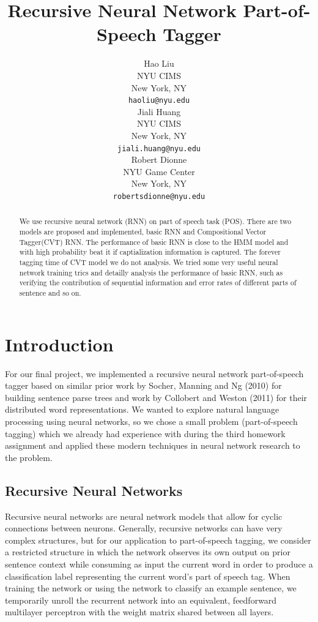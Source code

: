 \documentclass[11pt]{article}
\title{Recursive Neural Network Part-of-Speech Tagger}
\author{Hao Liu \\
  NYU CIMS \\
  New York, NY \\
  {\tt haoliu@nyu.edu} \\\And
  Jiali Huang \\
  NYU CIMS \\
  New York, NY \\
  {\tt jiali.huang@nyu.edu} \\\And
  Robert Dionne \\
  NYU Game Center \\
  New York, NY \\
  {\tt robertsdionne@nyu.edu} \\}
\date{}
\begin{document}
\maketitle
\begin{abstract}
 We use recursive neural network (RNN) on part of speech task (POS). There are two models are proposed and implemented, basic RNN and Compositional Vector Tagger(CVT) RNN. The performance of basic RNN is close to the HMM model and with high probability beat it if captialization information is captured. The forever tagging time of CVT model we do not analysis. We tried some very useful neural network training trics and detailly analysis the performance of basic RNN, such as verifying the contribution of sequential information and error rates of different parts of sentence and so on.
\end{abstract}

\section{Introduction}

For our final project, we implemented a recursive neural network part-of-speech tagger based on similar prior work by Socher, Manning and Ng (2010) for building sentence parse trees and work by Collobert and Weston (2011) for their distributed word representations. We wanted to explore natural language processing using neural networks, so we chose a small problem (part-of-speech tagging) which we already had experience with during the third homework assignment and applied these modern techniques in neural network research to the problem.

\subsection{Recursive Neural Networks}

Recursive neural networks are neural network models that allow for cyclic connections between neurons. Generally, recursive networks can have very complex structures, but for our application to part-of-speech tagging, we consider a restricted structure in which the network observes its own output on prior sentence context while consuming as input the current word in order to produce a classification label representing the current word's part of speech tag. When training the network or using the network to classify an example sentence, we temporarily unroll the recurrent network into an equivalent, feedforward multilayer perceptron with the weight matrix shared between all layers.
\end{document}

